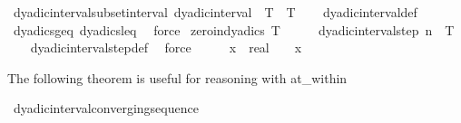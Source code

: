 \begin{isabellebody}
\endisatagproof
{\isafoldproof}%
%
\isadelimproof
\isanewline
%
\endisadelimproof
\isanewline
{}\isamarkupfalse%
\ dyadic{\isacharunderscore}{\kern0pt}interval{\isacharunderscore}{\kern0pt}subset{\isacharunderscore}{\kern0pt}interval{\isacharcolon}{\kern0pt}\ {\isachardoublequoteopen}{\isacharparenleft}{\kern0pt}dyadic{\isacharunderscore}{\kern0pt}interval\ {}\ T{\isacharparenright}{\kern0pt}\ {\isasymsubseteq}\ {\isacharbraceleft}{\kern0pt}{}{\isachardot}{\kern0pt}{\isachardot}{\kern0pt}T{\isacharbraceright}{\kern0pt}{\isachardoublequoteclose}\isanewline
%
\isadelimproof
\ \ %
\endisadelimproof
%
\isatagproof
{}\isamarkupfalse%
\ dyadic{\isacharunderscore}{\kern0pt}interval{\isacharunderscore}{\kern0pt}def\ \isamarkupfalse%
\ dyadics{\isacharunderscore}{\kern0pt}geq\ dyadics{\isacharunderscore}{\kern0pt}leq\ \isamarkupfalse%
\ force%
\endisatagproof
{\isafoldproof}%
%
\isadelimproof
\isanewline
%
\endisadelimproof
\isanewline
{}\isamarkupfalse%
\ zero{\isacharunderscore}{\kern0pt}in{\isacharunderscore}{\kern0pt}dyadics{\isacharcolon}{\kern0pt}\ {\isachardoublequoteopen}T\ {\isasymge}\ {}\ {\isasymLongrightarrow}\ {}\ {\isasymin}\ dyadic{\isacharunderscore}{\kern0pt}interval{\isacharunderscore}{\kern0pt}step\ n\ {}\ T{\isachardoublequoteclose}\isanewline
%
\isadelimproof
\ \ %
\endisadelimproof
%
\isatagproof
{}\isamarkupfalse%
\ dyadic{\isacharunderscore}{\kern0pt}interval{\isacharunderscore}{\kern0pt}step{\isacharunderscore}{\kern0pt}def\ \isamarkupfalse%
\ force%
\endisatagproof
{\isafoldproof}%
%
\isadelimproof
\isanewline
%
\endisadelimproof
\isanewline
{}\isamarkupfalse%
\ \isanewline
%
\isadelimproof
\ \ %
\endisadelimproof
%
\isatagproof
{}\isamarkupfalse%
\ {\isachardoublequoteopen}{\isacharparenleft}{\kern0pt}x\ {\isacharcolon}{\kern0pt}{\isacharcolon}{\kern0pt}\ real{\isacharparenright}{\kern0pt}\ {\isacharequal}{\kern0pt}\ {}{\isachardoublequoteclose}\ \ x%
\endisatagproof
{\isafoldproof}%
%
\isadelimproof
\isanewline
%
\endisadelimproof
{}\isamarkupfalse%
%
\begin{isamarkuptext}%
The following theorem is useful for reasoning with at_within%
\end{isamarkuptext}\isamarkuptrue%
\isamarkupfalse%
\ dyadic{\isacharunderscore}{\kern0pt}interval{\isacharunderscore}{\kern0pt}converging{\isacharunderscore}{\kern0pt}sequence{\isacharcolon}{\kern0pt}\isanewline

\end{isabellebody}
